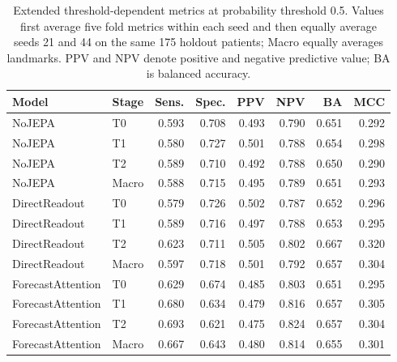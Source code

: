 \begin{table}[t]
\centering
\small
\caption{Extended threshold-dependent metrics at probability threshold 0.5. Values first average five fold metrics within each seed and then equally average seeds 21 and 44 on the same 175 holdout patients; Macro equally averages landmarks. PPV and NPV denote positive and negative predictive value; BA is balanced accuracy.}
\label{tab:extended_operating}
\begin{tabular}{llrrrrrr}
\toprule
Model & Stage & Sens. & Spec. & PPV & NPV & BA & MCC \\
\midrule
NoJEPA & T0 & 0.593 & 0.708 & 0.493 & 0.790 & 0.651 & 0.292 \\
NoJEPA & T1 & 0.580 & 0.727 & 0.501 & 0.788 & 0.654 & 0.298 \\
NoJEPA & T2 & 0.589 & 0.710 & 0.492 & 0.788 & 0.650 & 0.290 \\
NoJEPA & Macro & 0.588 & 0.715 & 0.495 & 0.789 & 0.651 & 0.293 \\
\midrule
DirectReadout & T0 & 0.579 & 0.726 & 0.502 & 0.787 & 0.652 & 0.296 \\
DirectReadout & T1 & 0.589 & 0.716 & 0.497 & 0.788 & 0.653 & 0.295 \\
DirectReadout & T2 & 0.623 & 0.711 & 0.505 & 0.802 & 0.667 & 0.320 \\
DirectReadout & Macro & 0.597 & 0.718 & 0.501 & 0.792 & 0.657 & 0.304 \\
\midrule
ForecastAttention & T0 & 0.629 & 0.674 & 0.485 & 0.803 & 0.651 & 0.295 \\
ForecastAttention & T1 & 0.680 & 0.634 & 0.479 & 0.816 & 0.657 & 0.305 \\
ForecastAttention & T2 & 0.693 & 0.621 & 0.475 & 0.824 & 0.657 & 0.304 \\
ForecastAttention & Macro & 0.667 & 0.643 & 0.480 & 0.814 & 0.655 & 0.301 \\
\bottomrule
\end{tabular}
\end{table}
